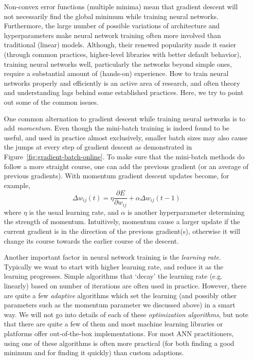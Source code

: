 Non-convex error functions (multiple minima)
mean that gradient descent will not necessarily find the global minimum
while training neural networks.
Furthermore, the large number of possible variations of architecture
and hyperparameters%
make neural network training
often more involved than traditional (linear) models.
Although, their renewed popularity made it easier
(through common practices, higher-level libraries with better default behavior),
training neural networks well,
particularly the networks beyond simple ones,
require a substantial amount of (hands-on) experience.
How to train neural networks properly and efficiently is
an active area of research,
and often theory and understanding lags behind some established practices.
Here, we try to point out some of the common issues.

One common alternation to gradient descent
while training neural networks is to add \emph{momentum}.
Even though the mini-batch training is indeed found to be useful,
and used in practice almost exclusively,
smaller batch sizes may also cause the jumps at every step of gradient descent
as demonstrated in Figure~\ref{fig:gradient-batch-online}.
To make sure that the mini-batch methods do follow a more straight course,
one can add the previous gradient (or an average of previous gradients).
With momentum gradient descent updates become, for example,
\begin{equation*}
    \Delta w_{ij}(t) = \eta \frac{\partial E}{\partial w_{ij}}
                       + \alpha \Delta w_{ij}(t-1)
\end{equation*}
where $\eta$ is the usual learning rate,
and $\alpha$ is another hyperparameter determining the strength of momentum.
Intuitively, momentum cause a larger update
if the current gradient is in the direction of the previous gradient(s),
otherwise it will change its course towards the earlier course of the descent.

Another important factor in neural network training is the \emph{learning rate}.
Typically we want to start with higher learning rate,
and reduce it as the learning progresses.
Simple algorithms that `decay' the learning rate (e.g. linearly) based on
number of iterations are often used in practice.
However, there are quite a few \emph{adaptive} algorithms which
set the learning (and possibly other parameters
such as the momentum parameter we discussed above) in a smart way.
We will not go into details of each of these \emph{optimization algorithms},
but note that there are quite a few of them and most machine learning
libraries or platforms offer out-of-the-box implementations.%
For most ANN practitioners,
using one of these algorithms is often more practical
(for both finding a good minimum and for finding it quickly)
than custom adaptions.


